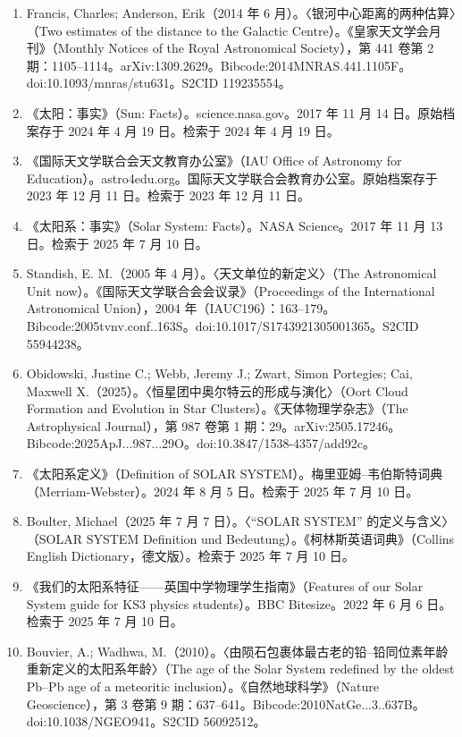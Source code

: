 \begin{enumerate}
\item Francis, Charles; Anderson, Erik（2014 年 6 月）。〈银河中心距离的两种估算〉（Two estimates of the distance to the Galactic Centre）。《皇家天文学会月刊》（Monthly Notices of the Royal Astronomical Society），第 441 卷第 2 期：1105–1114。arXiv:1309.2629。Bibcode:2014MNRAS.441.1105F。doi:10.1093/mnras/stu631。S2CID 119235554。
\item 《太阳：事实》（Sun: Facts）。science.nasa.gov。2017 年 11 月 14 日。原始档案存于 2024 年 4 月 19 日。检索于 2024 年 4 月 19 日。
\item 《国际天文学联合会天文教育办公室》（IAU Office of Astronomy for Education）。astro4edu.org。国际天文学联合会教育办公室。原始档案存于 2023 年 12 月 11 日。检索于 2023 年 12 月 11 日。
\item 《太阳系：事实》（Solar System: Facts）。NASA Science。2017 年 11 月 13 日。检索于 2025 年 7 月 10 日。
\item Standish, E. M.（2005 年 4 月）。〈天文单位的新定义〉（The Astronomical Unit now）。《国际天文学联合会会议录》（Proceedings of the International Astronomical Union），2004 年（IAUC196）：163–179。Bibcode:2005tvnv.conf..163S。doi:10.1017/S1743921305001365。S2CID 55944238。
\item Obidowski, Justine C.; Webb, Jeremy J.; Zwart, Simon Portegies; Cai, Maxwell X.（2025）。〈恒星团中奥尔特云的形成与演化〉（Oort Cloud Formation and Evolution in Star Clusters）。《天体物理学杂志》（The Astrophysical Journal），第 987 卷第 1 期：29。arXiv:2505.17246。Bibcode:2025ApJ...987...29O。doi:10.3847/1538-4357/add92c。
\item 《太阳系定义》（Definition of SOLAR SYSTEM）。梅里亚姆–韦伯斯特词典（Merriam-Webster）。2024 年 8 月 5 日。检索于 2025 年 7 月 10 日。
\item Boulter, Michael（2025 年 7 月 7 日）。〈“SOLAR SYSTEM” 的定义与含义〉（SOLAR SYSTEM Definition und Bedeutung）。《柯林斯英语词典》（Collins English Dictionary，德文版）。检索于 2025 年 7 月 10 日。
\item 《我们的太阳系特征——英国中学物理学生指南》（Features of our Solar System guide for KS3 physics students）。BBC Bitesize。2022 年 6 月 6 日。检索于 2025 年 7 月 10 日。
\item Bouvier, A.; Wadhwa, M.（2010）。〈由陨石包裹体最古老的铅–铅同位素年龄重新定义的太阳系年龄〉（The age of the Solar System redefined by the oldest Pb–Pb age of a meteoritic inclusion）。《自然地球科学》（Nature Geoscience），第 3 卷第 9 期：637–641。Bibcode:2010NatGe...3..637B。doi:10.1038/NGEO941。S2CID 56092512。

\end{enumerate}

